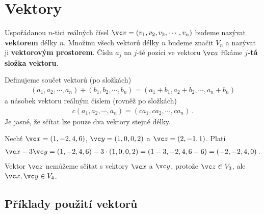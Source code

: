 \section{Vektory}

Uspořádanou $n$-tici reálných čísel $\vc v = (v_1,v_2,v_3, \cdots, v_n)$ budeme nazývat \textbf{vektorem} délky $n$. Množinu všech vektorů délky $n$ budeme značit $V_n$ a nazývat ji \textbf{vektorovým prostorem}. Číslu $a_j$ na $j$-té pozici ve vektoru $\vc a$ říkáme \textbf{$j$-tá složka vektoru}.

Definujeme součet vektorů (po složkách) \begin{align}
    (a_1,a_2,\cdots, a_n) + (b_1,b_2,\cdots, b_n) = (a_1+b_1, a_2 + b_2, \cdots , a_n + b_n)
\end{align}
a násobek vektoru reálným číslem (rovněž po složkách) \begin{align}
    c (a_1, a_2, \cdots, a_n) = (c a_1, c a_2, \cdots, c a_n) \:.
\end{align}
Je jasné, že sčítat lze pouze dva vektory stejné délky.

\begin{example}
    Nechť $\vc x = (1,-2,4,6)$, $\vc y = (1,0,0,2)$ a $\vc z = (2,-1,1)$. Platí \begin{align}
        \vc x - 3 \vc y = (1,-2,4,6) - 3\cdot(1,0,0,2) = (1-3,-2,4,6-6) = (-2,-2,4,0) \:.
    \end{align}
    Vektor $\vc z$ nemůžeme sčítat s vektory $\vc x$ a $\vc y$, protože $\vc z \in V_3$, ale $\vc x, \vc y \in V_4$.
\end{example}

\subsection*{Příklady použití vektorů}

